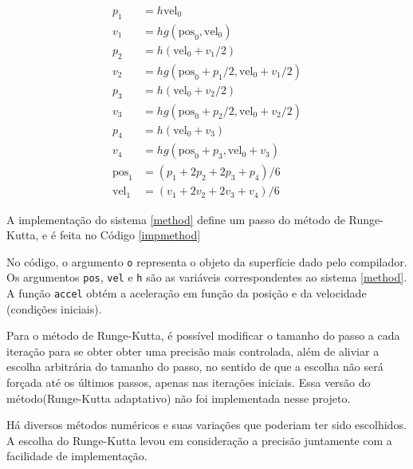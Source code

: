 \begin{equation}
\label{method}
\begin{split}
    p_1 & = h\text{vel}_0 \\
    v_1 & = hg(\text{pos}_0, \text{vel}_0) \\
    p_2 & = h(\text{vel}_0+v_1/2) \\
    v_2 & = hg(\text{pos}_0+p_1/2, \text{vel}_0+v_1/2) \\
    p_3 & = h(\text{vel}_0+v_2/2) \\
    v_3 & = hg(\text{pos}_0+p_2/2, \text{vel}_0+v_2/2) \\
    p_4 & = h(\text{vel}_0+v_3) \\
    v_4 & = hg(\text{pos}_0+p_3, \text{vel}_0+v_3) \\
    \text{pos}_1 & = (p_1+2p_2+2p_3+p_4)/6 \\
    \text{vel}_1 & = (v_1+2v_2+2v_3+v_4)/6
\end{split}
\end{equation}

A implementação do sistema \ref{method} define um passo do método de Runge-Kutta,
e é feita no Código \ref{impmethod}


No código, o argumento \texttt{o} representa o objeto da superfície dado pelo compilador.
Os argumentos \texttt{pos}, \texttt{vel} e \texttt{h} são as variáveis correspondentes ao sistema \ref{method}.
A função \texttt{accel} obtém a aceleração em função da posição e da velocidade
(condições iniciais).

Para o método de Runge-Kutta, é possível modificar o tamanho do passo
a cada iteração para se obter obter uma precisão mais controlada,
além de aliviar a escolha arbitrária do tamanho do passo, no sentido de
que a escolha não será forçada até os últimos passos, apenas nas iterações iniciais.
Essa versão do método(Runge-Kutta adaptativo) não foi implementada nesse projeto.

Há diversos métodos numéricos e suas variações que poderiam 
ter sido escolhidos. A escolha do Runge-Kutta levou em consideração
a precisão juntamente com a facilidade de implementação.